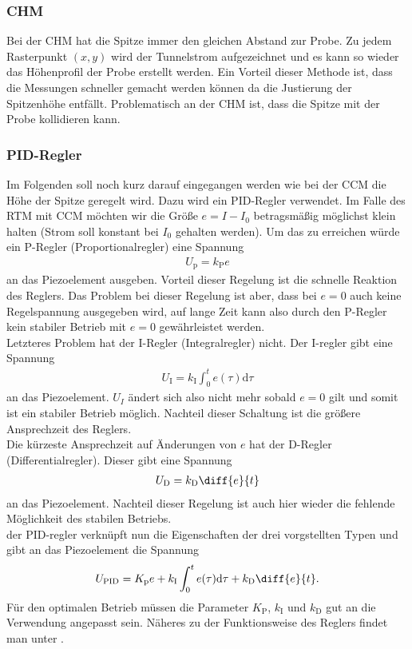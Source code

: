 \subsubsection{CHM}
Bei der CHM hat die Spitze immer den gleichen Abstand zur Probe. Zu jedem Rasterpunkt $(x,y)$ wird der Tunnelstrom aufgezeichnet und es kann so wieder das Höhenprofil der Probe erstellt werden. Ein Vorteil dieser Methode ist, dass die Messungen schneller gemacht werden können da die Justierung der Spitzenhöhe entfällt. Problematisch an der CHM ist, dass die Spitze mit der Probe kollidieren kann.

\subsubsection{PID-Regler}
Im Folgenden soll noch kurz darauf eingegangen werden wie bei der CCM die Höhe der Spitze geregelt wird. Dazu wird ein PID-Regler verwendet. Im Falle des RTM mit CCM möchten wir die Größe $e=I-I_0$ betragsmäßig möglichst klein halten (Strom soll konstant bei $I_0$ gehalten werden). Um das zu erreichen würde ein P-Regler (Proportionalregler) eine Spannung 
\begin{align*}
  U_\mathrm{p}=k_\mathrm{P}e
\end{align*} 
an das Piezoelement ausgeben. Vorteil dieser Regelung ist die schnelle Reaktion des Reglers. Das Problem bei dieser Regelung ist aber, dass bei $e=0$ auch keine Regelspannung ausgegeben wird, auf lange Zeit kann also durch den P-Regler kein stabiler Betrieb mit $e=0$ gewährleistet werden.\\
Letzteres Problem hat der I-Regler (Integralregler) nicht. Der I-regler gibt eine Spannung
\begin{align*}
  U_\mathrm{I}=k_\mathrm{I}\int_0^t e(\tau) \mathrm{d}\tau 
\end{align*}
an das Piezoelement. $U_I$ ändert sich also nicht mehr sobald $e=0$ gilt und somit ist ein stabiler Betrieb möglich. Nachteil dieser Schaltung ist die größere Ansprechzeit des Reglers. \\
Die kürzeste Ansprechzeit auf Änderungen von $e$ hat der D-Regler (Differentialregler). Dieser gibt eine Spannung 
\begin{align*}
  U_\mathrm{D}=k_\mathrm{D} \diff{e}{t}
\end{align*}
an das Piezoelement. Nachteil dieser Regelung ist auch hier wieder die fehlende Möglichkeit des stabilen Betriebs. \\
der PID-regler verknüpft nun die Eigenschaften der drei vorgstellten Typen und gibt an das Piezoelement die Spannung
\begin{align*}
  U_\mathrm{PID}=K_\mathrm{p}e + k_\mathrm{I}\int_0^t e(\tau) \mathrm{d}\tau + k_\mathrm{D} \diff{e}{t}.
\end{align*}
Für den optimalen Betrieb müssen die Parameter $K_\mathrm{P}$, $k_\mathrm{I}$ und $k_\mathrm{D}$ gut an die Verwendung angepasst sein. Näheres zu der Funktionsweise des Reglers findet man unter \cite{PID}.


